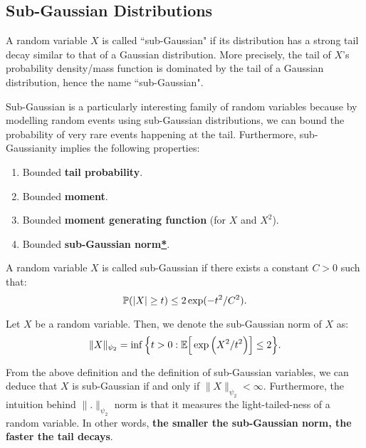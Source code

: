 \newcommand{\BTPSG}{\hyperref[thm:bounded_tail_equiv_sg]{(\mathrm{{\bf BTP-SG}})}}
\subsection{Sub-Gaussian Distributions}
A random variable $X$ is called ``sub-Gaussian" if its distribution has a strong tail decay similar to that of a Gaussian distribution. More precisely, the tail of $X$'s probability density/mass function is dominated by the tail of a Gaussian distribution, hence the name ``sub-Gaussian".

\noindent\newline Sub-Gaussian is a particularly interesting family of random variables because by modelling random events using sub-Gaussian distributions, we can bound the probability of very rare events happening at the tail. Furthermore, sub-Gaussianity implies the following properties:
\begin{enumerate}[label=(\roman*)]
	\item Bounded \textbf{tail probability}.
	\item Bounded \textbf{moment}.
	\item Bounded \textbf{moment generating function} (for $X$ and $X^2$).
	\item Bounded \textbf{sub-Gaussian norm\hyperref[sec:subgaussian_norm]{*}}.
\end{enumerate} 

\begin{definition}
	\label{sec:subgaussian_var}
	A random variable $X$ is called sub-Gaussian if there exists a constant $C>0$ such that:
	\begin{equation}
		\mathbb{P}(|X|\ge t) \le 2\exp(-t^2/C^2).	
	\end{equation} 
\end{definition} 

\begin{definition}
	\label{sec:subgaussian_norm}
	Let $X$ be a random variable. Then, we denote the sub-Gaussian norm of $X$ as:
	\begin{equation}
		\|X\|_{\psi_2} = \inf\Big\{ 
			t > 0: \mathbb{E}\Big[ \exp\Big( X^2/t^2 \Big) \Big] \le 2
		 \Big\}.
	\end{equation} 

	\noindent From the above definition and the definition of sub-Gaussian variables, we can deduce that $X$ is sub-Gaussian if and only if $\|X\|_{\psi_2} < \infty$. Furthermore, the intuition behind $\|.\|_{\psi_2}$ norm is that it measures the light-tailed-ness of a random variable. In other words, \textbf{the smaller the sub-Gaussian norm, the faster the tail decays}.
\end{definition} 


